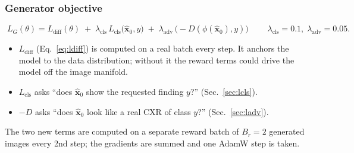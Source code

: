 \documentclass[twoside,english]{article}
\newcommand{\hx}{\hat{\mathbf{x}}_0}
\begin{document}
\subsubsection{Generator objective}
\begin{equation}
\boxed{\;L_G(\theta)=L_{\text{diff}}(\theta)\;+\;\lambda_{\text{cls}}\,L_{\text{cls}}\big(\hx,y\big)\;+\;\lambda_{\text{adv}}\,\big(-D(\phi(\hx),y)\big)\;}\qquad \lambda_{\text{cls}}=0.1,\;\lambda_{\text{adv}}=0.05 .\label{eq:LG}
\end{equation}
\begin{itemize}\setlength\itemsep{0pt}
\item $L_{\text{diff}}$ (Eq.~\ref{eq:ldiff}) is computed on a real batch every step. It anchors the model to the data distribution; without it the reward terms could drive the model off the image manifold.
\item $L_{\text{cls}}$ asks ``does $\hx$ show the requested finding $y$?'' (Sec.~\ref{sec:lcls}).
\item $-D$ asks ``does $\hx$ look like a real CXR of class $y$?'' (Sec.~\ref{sec:ladv}).
\end{itemize}
The two new terms are computed on a separate reward batch of $B_r=2$ generated images every 2nd step; the gradients are summed and one AdamW step is taken.
\end{document}
